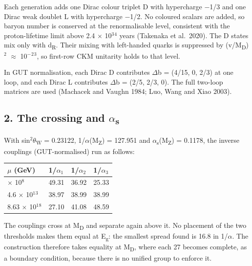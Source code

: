 \documentclass[
  11pt,
]{article}
\begin{document}
Each generation adds one Dirac colour triplet D with hypercharge \ensuremath{-}1/3 and one Dirac weak doublet L with hypercharge \ensuremath{-}1/2. No coloured scalars are added, so baryon number is conserved at the renormalisable level, consistent with the proton-lifetime limit above 2.4 \ensuremath{\times} 10\ensuremath{^{3}}\ensuremath{^{4}} years (Takenaka et al.~2020). The D states mix only with d\textsubscript{R}. Their mixing with left-handed quarks is suppressed by (v/M\textsubscript{D})\ensuremath{^{2}} \ensuremath{\approx} 10\ensuremath{^{-}}\ensuremath{^{2}}\ensuremath{^{3}}, so first-row CKM unitarity holds to that level.

In GUT normalisation, each Dirac D contributes \ensuremath{\Delta}b = (4/15, 0, 2/3) at one loop, and each Dirac L contributes \ensuremath{\Delta}b = (2/5, 2/3, 0). The full two-loop matrices are used (Machacek and Vaughn 1984; Luo, Wang and Xiao 2003).

\hypertarget{the-crossing-and-ux3b1s}{%
\subsection{\texorpdfstring{2. The crossing and \ensuremath{\alpha}\textsubscript{s}}{2. The crossing and αs}}\label{the-crossing-and-ux3b1s}}

With sin\ensuremath{^{2}}\ensuremath{\theta}\textsubscript{W} = 0.23122, 1/\ensuremath{\alpha}(M\textsubscript{Z}) = 127.951 and \ensuremath{\alpha}\textsubscript{s}(M\textsubscript{Z}) = 0.1178, the inverse couplings (GUT-normalised) run as follows:

\begin{longtable}[]{@{}llll@{}}
\toprule\noalign{}
\ensuremath{\mu} (GeV) & 1/\ensuremath{\alpha}\ensuremath{_{1}} & 1/\ensuremath{\alpha}\ensuremath{_{2}} & 1/\ensuremath{\alpha}\ensuremath{_{3}} \\
\midrule\noalign{}
\endhead
\bottomrule\noalign{}
\endlastfoot
2.4 \ensuremath{\times} 10\ensuremath{^{8}} & 49.31 & 36.92 & 25.33 \\
4.6 \ensuremath{\times} 10\ensuremath{^{1}}\ensuremath{^{3}} & 38.97 & 38.99 & 38.99 \\
8.63 \ensuremath{\times} 10\ensuremath{^{1}}\ensuremath{^{8}} & 27.10 & 41.08 & 48.59 \\
\end{longtable}

The couplings cross at M\textsubscript{D} and separate again above it. No placement of the two thresholds makes them equal at E\textsubscript{g}: the smallest spread found is 16.8 in 1/\ensuremath{\alpha}. The construction therefore takes equality at M\textsubscript{D}, where each 27 becomes complete, as a boundary condition, because there is no unified group to enforce it.
\end{document}
